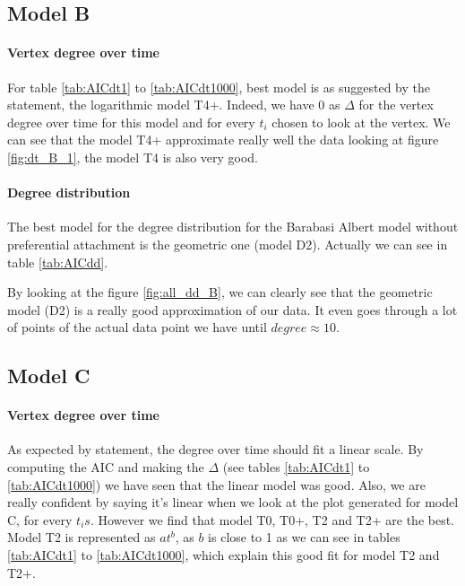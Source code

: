 \documentclass[a4paper]{article}
\begin{document}
\subsection{Model B}

\paragraph{Vertex degree over time}

For table \ref{tab:AICdt1} to \ref{tab:AICdt1000}, best model is as suggested by
the statement, the logarithmic model T4+. Indeed, we have 0 as $\Delta$ for the
vertex degree over time for this model and for every $t_i$ chosen to look at the
vertex. We can see that the model T4+ approximate really well the data looking
at figure \ref{fig:dt_B_1}, the model T4 is also very good.

\paragraph{Degree distribution}


The best model for the degree distribution for the Barabasi Albert model without
preferential attachment is the geometric one (model D2). Actually we can see
 in table
\ref{tab:AICdd}.

By looking at the figure \ref{fig:all_dd_B}, we can clearly see that
the geometric model (D2) is a really good approximation of our data. It
even goes through a lot of points of the actual data point we have until
$degree \approx 10$.

\subsection{Model C}

\paragraph{Vertex degree over time}

As expected by statement, the degree over time should fit a linear scale. By
computing the AIC and making the $\Delta$ (see tables \ref{tab:AICdt1} to
\ref{tab:AICdt1000}) we have seen that the linear model was good. Also, we are
really confident by saying it's linear when we look at the plot generated for
model C, for every $t_is$. However we find that model T0, T0+, T2 and T2+ are
the best. Model T2 is represented as $at^b$, as $b$ is close to 1 as we can see
in tables \ref{tab:AICdt1} to \ref{tab:AICdt1000}, which explain this good fit
for model T2 and T2+.
\end{document}
